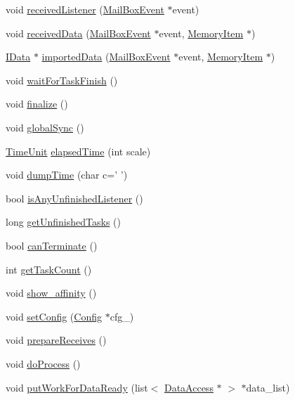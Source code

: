 \begin{DoxyCompactItemize}
\item 
void \hyperlink{classengine_ae0b940ebb7f5104cc2757bc9c92d0708}{receivedListener} (\hyperlink{struct_mail_box_event}{MailBoxEvent} $\ast$event)
\item 
void \hyperlink{classengine_ab244f803ac3edc7ec1341e9b9a11ca33}{receivedData} (\hyperlink{struct_mail_box_event}{MailBoxEvent} $\ast$event, \hyperlink{struct_memory_item}{MemoryItem} $\ast$)
\item 
\hyperlink{class_i_data}{IData} $\ast$ \hyperlink{classengine_af65fff57c4729b10421eaa064a254d64}{importedData} (\hyperlink{struct_mail_box_event}{MailBoxEvent} $\ast$event, \hyperlink{struct_memory_item}{MemoryItem} $\ast$)
\item 
void \hyperlink{classengine_a01a2f71979b984b73bd95cf00629a71a}{waitForTaskFinish} ()
\item 
void \hyperlink{classengine_abe42ab122f70fe47049ad8c1170651a4}{finalize} ()
\item 
void \hyperlink{classengine_a9bc79f83757312b0ff06a7cfbe0c1c65}{globalSync} ()
\item 
\hyperlink{basic_8hpp_ac0ec6c8e4757751eaaa618bbf62ab6c9}{TimeUnit} \hyperlink{classengine_a1b418ba0ce7d9614cd03a30ab119456a}{elapsedTime} (int scale)
\item 
void \hyperlink{classengine_aa53319327cf7350b84bb928214e3dae0}{dumpTime} (char c=' ')
\item 
bool \hyperlink{classengine_ab711383a9b6380efdc76eabc98f628de}{isAnyUnfinishedListener} ()
\item 
long \hyperlink{classengine_abe97f2997638c312c34128fd581472dd}{getUnfinishedTasks} ()
\item 
bool \hyperlink{classengine_acf7ab54eb2e616e471686ec14157c9e7}{canTerminate} ()
\item 
int \hyperlink{classengine_a9897b8efc6acb6c6bcdd888ed4d67c96}{getTaskCount} ()
\item 
void \hyperlink{classengine_a2e4cd5ddf1d94f2e937d224c933608dd}{show\_\-affinity} ()
\item 
void \hyperlink{classengine_ab44d977af665ec74444db0b781d765c7}{setConfig} (\hyperlink{class_config}{Config} $\ast$cfg\_\-)
\item 
void \hyperlink{classengine_af66d8ac03cdba8d98a79eb424622c25d}{prepareReceives} ()
\item 
void \hyperlink{classengine_ad485fec9e6edc79fd24065e98736c290}{doProcess} ()
\item 
void \hyperlink{classengine_a18d1d14ee93df029db2216460a8ac6f4}{putWorkForDataReady} (list$<$ \hyperlink{struct_data_access}{DataAccess} $\ast$ $>$ $\ast$data\_\-list)

\end{DoxyCompactItemize}
